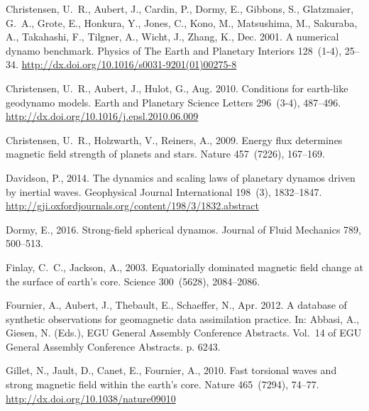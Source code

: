 \documentclass[12pt, a4paper]{article}
\begin{document}
\begin{thebibliography}{73}
Christensen, U.~R., Aubert, J., Cardin, P., Dormy, E., Gibbons, S., Glatzmaier,
  G.~A., Grote, E., Honkura, Y., Jones, C., Kono, M., Matsushima, M., Sakuraba,
  A., Takahashi, F., Tilgner, A., Wicht, J., Zhang, K., Dec. 2001. A numerical
  dynamo benchmark. Physics of The Earth and Planetary Interiors 128~(1-4),
  25--34.
\newline\urlprefix\url{http://dx.doi.org/10.1016/s0031-9201(01)00275-8}

Christensen, U.~R., Aubert, J., Hulot, G., Aug. 2010. Conditions for earth-like
  geodynamo models. Earth and Planetary Science Letters 296~(3-4), 487--496.
\newline\urlprefix\url{http://dx.doi.org/10.1016/j.epsl.2010.06.009}

Christensen, U.~R., Holzwarth, V., Reiners, A., 2009. Energy flux determines
  magnetic field strength of planets and stars. Nature 457~(7226), 167--169.

Davidson, P., 2014. The dynamics and scaling laws of planetary dynamos driven
  by inertial waves. Geophysical Journal International 198~(3), 1832--1847.
\newline\urlprefix\url{http://gji.oxfordjournals.org/content/198/3/1832.abstract}

Dormy, E., 2016. Strong-field spherical dynamos. Journal of Fluid Mechanics
  789, 500--513.

Finlay, C.~C., Jackson, A., 2003. Equatorially dominated magnetic field change
  at the surface of earth's core. Science 300~(5628), 2084--2086.

{Fournier}, A., {Aubert}, J., {Thebault}, E., {Schaeffer}, N., Apr. 2012. {A
  database of synthetic observations for geomagnetic data assimilation
  practice}. In: {Abbasi}, A., {Giesen}, N. (Eds.), EGU General Assembly
  Conference Abstracts. Vol.~14 of EGU General Assembly Conference Abstracts.
  p. 6243.

Gillet, N., Jault, D., Canet, E., Fournier, A., 2010. Fast torsional waves and
  strong magnetic field within the earth's core. Nature 465~(7294), 74--77.
\newline\urlprefix\url{http://dx.doi.org/10.1038/nature09010}


\end{thebibliography}
\end{document}
